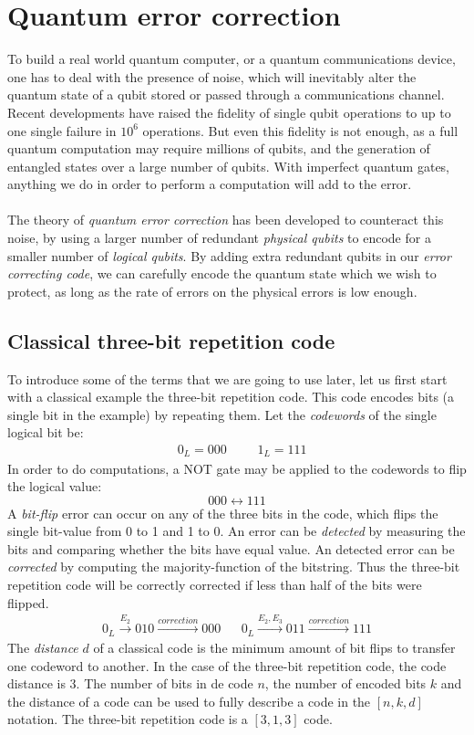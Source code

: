 \chapter{Quantum error correction}

To build a real world quantum computer, or a quantum communications device, one has to deal with the presence of noise, which will inevitably alter the quantum state of a qubit stored or passed through a communications channel. Recent developments have raised the fidelity of single qubit operations to up to one single failure in $10^6$ operations. But even this fidelity is not enough, as a full quantum computation may require millions of qubits, and the generation of entangled states over a large number of qubits. With imperfect quantum gates, anything we do in order to perform a computation will add to the error. \\
\\
The theory of \emph{quantum error correction} has been developed to counteract this noise, by using a larger number of redundant \emph{physical qubits} to encode for a smaller number of \emph{logical qubits}. By adding extra redundant qubits in our \emph{error correcting code}, we can carefully encode the quantum state which we wish to protect, as long as the rate of errors on the physical errors is low enough.

\section{Classical three-bit repetition code}
To introduce some of the terms that we are going to use later, let us first start with a classical example the three-bit repetition code. This code encodes bits (a single bit in the example) by repeating them. Let the \emph{codewords} of the single logical bit be:
\begin{align}\label{eq:qb_3bitlogical}
    && 0_L = 000 &&& 1_L=111 &
\end{align}
In order to do computations, a NOT gate may be applied to the codewords to flip the logical value:
\begin{equation}
 000 \leftrightarrow 111
\end{equation}
A \emph{bit-flip} error can occur on any of the three bits in the code, which flips the single bit-value from 0 to 1 and 1 to 0. An error can be \emph{detected} by measuring the bits and comparing whether the bits have equal value. An detected error can be \emph{corrected} by computing the majority-function of the bitstring. Thus the three-bit repetition code will be correctly corrected if less than half of the bits were flipped.
\begin{align}
  0_L \xrightarrow{E_2} 010 \xrightarrow{correction} 000 && 0_L \xrightarrow{E_2, E_3} 011 \xrightarrow{correction} 111
\end{align}
The \emph{distance} $d$ of a classical code is the minimum amount of bit flips to transfer one codeword to another. In the case of the three-bit repetition code, the code distance is 3. The number of bits in de code $n$, the number of encoded bits $k$ and the distance of a code can be used to fully describe a code in the $[n, k, d]$ notation. The three-bit repetition code is a $[3,1,3]$ code.

